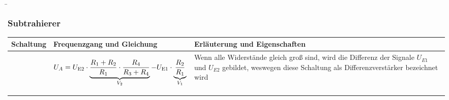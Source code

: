 \begin{frame}
    \b{
    \frametitle{Subtrahierer}
    \centering
    \begin{table}[ht]
    \label{tab:Subtrahierer}
    \begin{tabular}{|m{}|m{}|m{}|}
    \hline
    Schaltung & Frequenzgang und Gleichung & Erläuterung und Eigenschaften\\ %
    \hline
    \vspace{0.5cm}
    \centering
    
      &
      \begin{center}
      
 \end{center}
 \vspace{1ex}
 \[
 \begin{aligned}
    {U_A} = {U_{{\textnormal{E2}}}} \cdot \underbrace{ \frac{R_1 + R_2}{R_1} \cdot \frac{R_4}{R_3 + R_4}}_{V_2} - U_{\textnormal{E1}} \cdot \underbrace{\frac{R_2}{R_1}}_{V_1}
\end{aligned}
 \]
     &
     Wenn alle Widerstände gleich groß sind, wird die Differenz der Signale $U_{E1}$ und $U_{E2}$ gebildet, weswegen diese Schaltung als Differenzverstärker bezeichnet wird \\
    \hline
    \end{tabular}
    \end{table}
    }
\end{frame}

